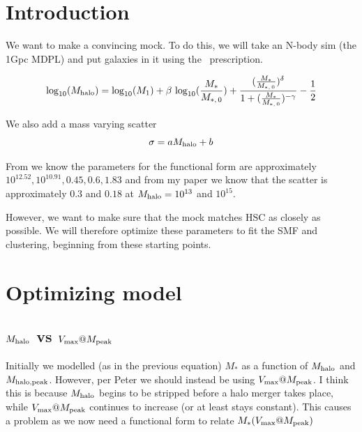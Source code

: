 \documentclass{article}
\makeatletter
\newcommand{\Mhalo}{\ensuremath{M_{\rm halo}}}
\newcommand{\MhaloPeak}{\ensuremath{M_{\rm halo, peak}}}
\newcommand{\vmp}{\ensuremath{V_{\rm max}@M_{\rm peak}}}
\newcommand{\tlogten}{{\rm log}_{10}}
\newcommand{\Mstar}{\ensuremath{M_{\ast}}}
\newcommand{\M}[1]{\ensuremath{M_{\ast,\,\rm #1}}}
\makeatother
\begin{document}
\section{Introduction}

We want to make a convincing mock. To do this, we will take an N-body sim (the 1Gpc MDPL) and put galaxies in it using the~\cite{Behroozi2010} prescription.

\begin{equation}
    \label{eq:sm_hm_functional_form}
    \tlogten{}(\Mhalo{}) = \tlogten{}(M_1) + \beta~\tlogten{}(\frac{\Mstar{}}{\M{0}}) + \frac{(\frac{\Mstar{}}{\M{0}})^{\delta}}{1 + (\frac{\Mstar{}}{\M{0}})^{- \gamma}} - \frac{1}{2}
\end{equation}


We also add a mass varying scatter
\begin{equation}
\sigma = a \Mhalo + b
\end{equation}

From \cite{Leauthaud2012} we know the parameters for the functional form are approximately $10^{12.52}, 10^{10.91}, 0.45, 0.6, 1.83$ and from my paper we know that the scatter is approximately $0.3$ and $0.18$ at $\Mhalo{} = 10^{13}$ and $10^{15}$.

However, we want to make sure that the mock matches HSC as closely as possible. We will therefore optimize these parameters to fit the SMF and clustering, beginning from these starting points.

\section{Optimizing model}

\subsection{\Mhalo{} vs \vmp{}}

Initially we modelled (as in the previous equation) \Mstar{} as a function of \Mhalo{} and \MhaloPeak{}. However, per Peter we should instead be using \vmp{}. I think this is because \Mhalo{} begins to be stripped before a halo merger takes place, while \vmp{} continues to increase (or at least stays constant). This causes a problem as we now need a functional form to relate $\Mstar(\vmp{})$
\end{document}
